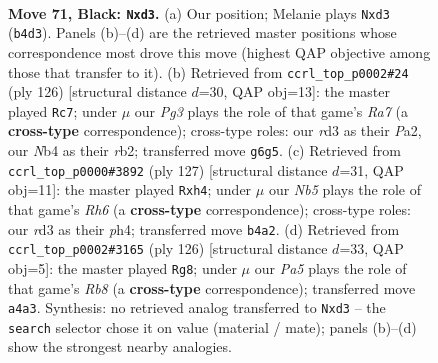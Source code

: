 \documentclass[11pt]{article}
\begin{document}
\clearpage

\begin{figure}[p]\centering
\begin{subfigure}{0.46\textwidth}\centering
\resizebox{\linewidth}{!}{%
\newchessgame
\chessboard[
  setfen={8/1p2R2p/1k4pP/5p2/pn3P2/3R4/7K/8 b - - 0 71},
  showmover=false,
  pgfstyle=straightmove, color=movearrow, markmove={b4-d3}
]}
\caption{}
\end{subfigure}\hfill
\begin{subfigure}{0.46\textwidth}\centering
\resizebox{\linewidth}{!}{%
\newchessgame
\chessboard[
  setfen={8/R7/8/8/1k1p4/1P3K1p/Pr3P1P/8 w - - 4 64},
  showmover=false,
  pgfstyle=straightmove, color=movearrow, markmove={a7-c7}
]}
\caption{}
\end{subfigure}
\\[4pt]
\begin{subfigure}{0.46\textwidth}\centering
\resizebox{\linewidth}{!}{%
\newchessgame
\chessboard[
  setfen={8/5pk1/3R2p1/1P5p/1K3P1P/7r/8/8 b - - 8 64},
  showmover=false,
  pgfstyle=straightmove, color=movearrow, markmove={h3-h4}
]}
\caption{}
\end{subfigure}\hfill
\begin{subfigure}{0.46\textwidth}\centering
\resizebox{\linewidth}{!}{%
\newchessgame
\chessboard[
  setfen={1R6/8/3P1k2/2K3pp/5p2/7P/3r2P1/8 w - - 1 64},
  showmover=false,
  pgfstyle=straightmove, color=movearrow, markmove={b8-g8}
]}
\caption{}
\end{subfigure}
\caption{\textbf{Move 71, Black: \texttt{Nxd3}.} (a) Our position; Melanie plays \texttt{Nxd3} (\texttt{b4d3}). Panels (b)--(d) are the retrieved master positions whose correspondence most drove this move (highest QAP objective among those that transfer to it). (b) Retrieved from \texttt{ccrl\_top\_p0002\#24} (ply 126) [structural distance $d$=30, QAP obj=13]: the master played \texttt{Rc7}; under $\mu$ our \emph{Pg3} plays the role of that game's \emph{Ra7} (a \textbf{cross-type} correspondence); cross-type roles: our \emph{r}d3 as their \emph{P}a2, our \emph{N}b4 as their \emph{r}b2; transferred move \texttt{g6g5}. (c) Retrieved from \texttt{ccrl\_top\_p0000\#3892} (ply 127) [structural distance $d$=31, QAP obj=11]: the master played \texttt{Rxh4}; under $\mu$ our \emph{Nb5} plays the role of that game's \emph{Rh6} (a \textbf{cross-type} correspondence); cross-type roles: our \emph{r}d3 as their \emph{p}h4; transferred move \texttt{b4a2}. (d) Retrieved from \texttt{ccrl\_top\_p0002\#3165} (ply 126) [structural distance $d$=33, QAP obj=5]: the master played \texttt{Rg8}; under $\mu$ our \emph{Pa5} plays the role of that game's \emph{Rb8} (a \textbf{cross-type} correspondence); transferred move \texttt{a4a3}. Synthesis: no retrieved analog transferred to \texttt{Nxd3} -- the \texttt{search} selector chose it on value (material / mate); panels (b)--(d) show the strongest nearby analogies.}
\label{fig:thought-m141}
\end{figure}
\end{document}
